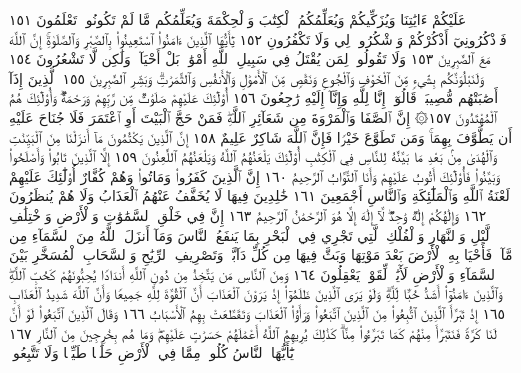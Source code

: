 عَلَيْكُمْ ءَايَٰتِنَا وَيُزَكِّيكُمْ وَيُعَلِّمُكُمُ ٱلْكِتَٰبَ وَٱلْحِكْمَةَ
وَيُعَلِّمُكُم مَّا لَمْ تَكُونُوا۟ تَعْلَمُونَ ١٥١ فَٱذْكُرُونِيٓ أَذْكُرْكُمْ
وَٱشْكُرُوا۟ لِي وَلَا تَكْفُرُونِ ١٥٢ يَٰٓأَيُّهَا ٱلَّذِينَ ءَامَنُوا۟
ٱسْتَعِينُوا۟ بِٱلصَّبْرِ وَٱلصَّلَوٰةِۚ إِنَّ ٱللَّهَ مَعَ ٱلصَّٰبِرِينَ ١٥٣
وَلَا تَقُولُوا۟ لِمَن يُقْتَلُ فِي سَبِيلِ ٱللَّهِ أَمْوَٰتُۢۚ بَلْ أَحْيَآءࣱ وَلَٰكِن
لَّا تَشْعُرُونَ ١٥٤ وَلَنَبْلُوَنَّكُم بِشَيْءࣲ مِّنَ ٱلْخَوْفِ وَٱلْجُوعِ
وَنَقْصࣲ مِّنَ ٱلْأَمْوَٰلِ وَٱلْأَنفُسِ وَٱلثَّمَرَٰتِۗ وَبَشِّرِ ٱلصَّٰبِرِينَ ١٥٥
ٱلَّذِينَ إِذَآ أَصَٰبَتْهُم مُّصِيبَةࣱ قَالُوٓا۟ إِنَّا لِلَّهِ وَإِنَّآ إِلَيْهِ رَٰجِعُونَ ١٥٦
أُو۟لَٰٓئِكَ عَلَيْهِمْ صَلَوَٰتࣱ مِّن رَّبِّهِمْ وَرَحْمَةࣱۖ وَأُو۟لَٰٓئِكَ
هُمُ ٱلْمُهْتَدُونَ ١٥٧۞ إِنَّ ٱلصَّفَا وَٱلْمَرْوَةَ مِن شَعَآئِرِ ٱللَّهِۖ
فَمَنْ حَجَّ ٱلْبَيْتَ أَوِ ٱعْتَمَرَ فَلَا جُنَاحَ عَلَيْهِ أَن يَطَّوَّفَ بِهِمَاۚ
وَمَن تَطَوَّعَ خَيْرࣰا فَإِنَّ ٱللَّهَ شَاكِرٌ عَلِيمٌ ١٥٨ إِنَّ ٱلَّذِينَ
يَكْتُمُونَ مَآ أَنزَلْنَا مِنَ ٱلْبَيِّنَٰتِ وَٱلْهُدَىٰ مِنۢ بَعْدِ مَا بَيَّنَّٰهُ
لِلنَّاسِ فِي ٱلْكِتَٰبِ أُو۟لَٰٓئِكَ يَلْعَنُهُمُ ٱللَّهُ وَيَلْعَنُهُمُ ٱللَّٰعِنُونَ ١٥٩
إِلَّا ٱلَّذِينَ تَابُوا۟ وَأَصْلَحُوا۟ وَبَيَّنُوا۟ فَأُو۟لَٰٓئِكَ أَتُوبُ عَلَيْهِمْ
وَأَنَا ٱلتَّوَّابُ ٱلرَّحِيمُ ١٦٠ إِنَّ ٱلَّذِينَ كَفَرُوا۟ وَمَاتُوا۟ وَهُمْ
كُفَّارٌ أُو۟لَٰٓئِكَ عَلَيْهِمْ لَعْنَةُ ٱللَّهِ وَٱلْمَلَٰٓئِكَةِ وَٱلنَّاسِ أَجْمَعِينَ ١٦١
خَٰلِدِينَ فِيهَا لَا يُخَفَّفُ عَنْهُمُ ٱلْعَذَابُ وَلَا هُمْ يُنظَرُونَ ١٦٢
وَإِلَٰهُكُمْ إِلَٰهࣱ وَٰحِدࣱۖ لَّآ إِلَٰهَ إِلَّا هُوَ ٱلرَّحْمَٰنُ ٱلرَّحِيمُ ١٦٣
إِنَّ فِي خَلْقِ ٱلسَّمَٰوَٰتِ وَٱلْأَرْضِ وَٱخْتِلَٰفِ ٱلَّيْلِ وَٱلنَّهَارِ
وَٱلْفُلْكِ ٱلَّتِي تَجْرِي فِي ٱلْبَحْرِ بِمَا يَنفَعُ ٱلنَّاسَ وَمَآ أَنزَلَ ٱللَّهُ
مِنَ ٱلسَّمَآءِ مِن مَّآءࣲ فَأَحْيَا بِهِ ٱلْأَرْضَ بَعْدَ مَوْتِهَا وَبَثَّ فِيهَا
مِن كُلِّ دَآبَّةࣲ وَتَصْرِيفِ ٱلرِّيَٰحِ وَٱلسَّحَابِ ٱلْمُسَخَّرِ بَيْنَ
ٱلسَّمَآءِ وَٱلْأَرْضِ لَأٓيَٰتࣲ لِّقَوْمࣲ يَعْقِلُونَ ١٦٤ وَمِنَ ٱلنَّاسِ
مَن يَتَّخِذُ مِن دُونِ ٱللَّهِ أَندَادࣰا يُحِبُّونَهُمْ كَحُبِّ ٱللَّهِۖ وَٱلَّذِينَ
ءَامَنُوٓا۟ أَشَدُّ حُبࣰّا لِّلَّهِۗ وَلَوْ يَرَى ٱلَّذِينَ ظَلَمُوٓا۟ إِذْ يَرَوْنَ
ٱلْعَذَابَ أَنَّ ٱلْقُوَّةَ لِلَّهِ جَمِيعࣰا وَأَنَّ ٱللَّهَ شَدِيدُ ٱلْعَذَابِ ١٦٥
إِذْ تَبَرَّأَ ٱلَّذِينَ ٱتُّبِعُوا۟ مِنَ ٱلَّذِينَ ٱتَّبَعُوا۟ وَرَأَوُا۟ ٱلْعَذَابَ
وَتَقَطَّعَتْ بِهِمُ ٱلْأَسْبَابُ ١٦٦ وَقَالَ ٱلَّذِينَ ٱتَّبَعُوا۟ لَوْ أَنَّ
لَنَا كَرَّةࣰ فَنَتَبَرَّأَ مِنْهُمْ كَمَا تَبَرَّءُوا۟ مِنَّاۗ كَذَٰلِكَ يُرِيهِمُ ٱللَّهُ
أَعْمَٰلَهُمْ حَسَرَٰتٍ عَلَيْهِمْۖ وَمَا هُم بِخَٰرِجِينَ مِنَ ٱلنَّارِ ١٦٧
يَٰٓأَيُّهَا ٱلنَّاسُ كُلُوا۟ مِمَّا فِي ٱلْأَرْضِ حَلَٰلࣰا طَيِّبࣰا وَلَا تَتَّبِعُوا۟
